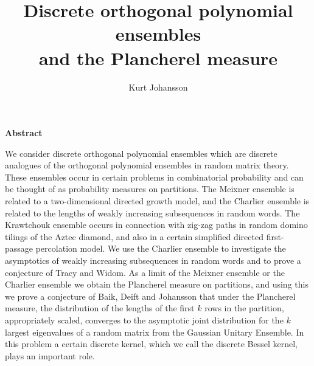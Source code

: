 
\title{Discrete orthogonal polynomial ensembles\\ and the Plancherel
measure} %
\acknowledgements{}
 \author{Kurt Johansson}


\bigbreak \centerline{\bf Abstract} 
\bigbreak
We consider discrete orthogonal polynomial ensembles
which are discrete analogues of the orthogonal polynomial ensembles in
random matrix theory. These ensembles occur in certain problems in 
combinatorial probability and can be thought of as probability measures
on partitions. The Meixner ensemble is related to a two-dimensional
directed growth model, and the Charlier ensemble is related to the lengths of 
weakly increasing subsequences in random words. The Krawtchouk ensemble
occurs in connection with zig-zag paths in random domino tilings of the
Aztec diamond, and also in a certain simplified directed first-passage
percolation model.
We use the Charlier ensemble 
to investigate the asymptotics of weakly increasing 
subsequences in random words and to prove a conjecture of Tracy and Widom.
As a limit of the Meixner ensemble or the Charlier ensemble we obtain the
Plancherel measure on partitions, and using this we prove a conjecture of
Baik, Deift and Johansson that under the Plancherel measure, the distribution
of the lengths of the first $k$ rows in the partition, appropriately scaled,
converges to the asymptotic joint distribution for the $k$ largest eigenvalues
of a random matrix from the Gaussian Unitary Ensemble. In this problem a 
certain discrete kernel, which we call the discrete Bessel kernel, plays
an important role.


